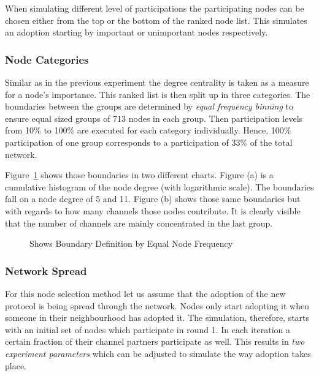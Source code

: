 \documentclass[final]{fhnwreport}       %
\begin{document}
When simulating different level of participations the participating nodes can be chosen either from the top or the bottom of the ranked node list. This simulates an adoption starting by important or unimportant nodes respectively. 

\subsubsection{Node Categories}\label{subsub:categ}
Similar as in the previous experiment the degree centrality is taken as a measure for a node's importance. This ranked list is then split up in three categories. The boundaries between the groups are determined by \emph{equal frequency binning} to ensure equal sized groups of 713 nodes in each group. Then participation levels from 10\% to 100\% are executed for each category individually. Hence, 100\% participation of one group corresponds to a participation of 33\% of the total network. 

Figure~\ref{fig:eqfreq} shows those boundaries in two different charts. Figure (a) is a cumulative histogram of the node degree (with logarithmic scale). The boundaries fall on a node degree of 5 and 11. Figure (b) shows those same boundaries but with regards to how many channels those nodes contribute. It is clearly visible that the number of channels are mainly concentrated in the last group. 

\begin{figure}[H]
\centering
{}\quad
{}
\caption{Shows Boundary Definition by Equal Node Frequency}
\label{fig:eqfreq}
\end{figure}

\subsubsection{Network Spread}
For this node selection method let us assume that the adoption of the new protocol is being spread through the network. Nodes only start adopting it when someone in their neighbourhood has adopted it. The simulation, therefore, starts with an initial set of nodes which participate in round 1. In each iteration a certain fraction of their channel partners participate as well. This results in \emph{two experiment parameters} which can be adjusted to simulate the way adoption takes place. 
\end{document}
